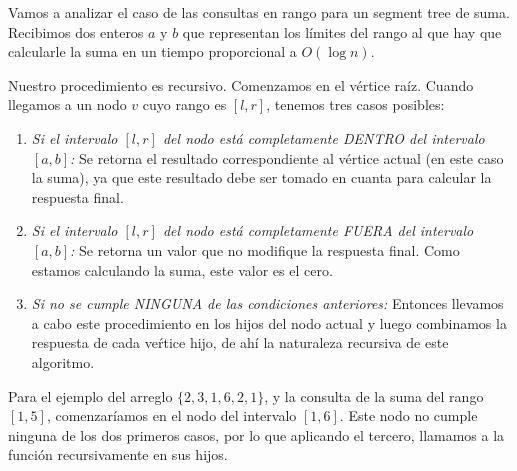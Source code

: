 Vamos a analizar el caso de las consultas en rango para un segment tree de suma. Recibimos dos enteros $a$ y $b$ que representan los l\'imites del rango al que hay que calcularle la suma en un tiempo proporcional a $O(\log n)$.

\begin{corollary}

    Nuestro pro\-ce\-di\-mien\-to es recursivo. Comenzamos en el v\'ertice ra\'iz. Cuando llegamos a un nodo $v$ cuyo rango es $[l, r]$, tenemos tres casos posibles:

    \begin{enumerate}
        \item{
            \textit{Si el intervalo $[l, r]$ del nodo est\'a completamente DENTRO del intervalo $[a, b]$:} Se retorna el resultado co\-rres\-pon\-dien\-te al v\'ertice actual (en este caso la suma), ya que este resultado debe ser tomado en cuanta para calcular la respuesta final.
        }
        \item{
           \textit{Si el intervalo $[l, r]$ del nodo est\'a completamente FUERA del intervalo $[a, b]$:} Se retorna un valor que no modifique la respuesta final. Como estamos calculando la suma, este valor es el cero.
        }
        \item{
            \textit{Si no se cumple NINGUNA de las condiciones anteriores:} Entonces llevamos a cabo este procedimiento en los hijos del nodo actual y luego combinamos la respuesta de cada ve\'rtice hijo, de ah\'i la naturaleza recursiva de este algoritmo.
        }
    \end{enumerate}

\end{corollary}



Para el ejemplo del arreglo $\{2, 3, 1, 6, 2, 1\}$, y la consulta de la suma del rango $[1, 5]$, comenzar\'iamos en el nodo del intervalo $[1, 6]$. Este nodo no cumple ninguna de los dos primeros casos, por lo que aplicando el tercero, llamamos a la funci\'on recursivamente en sus hijos.

